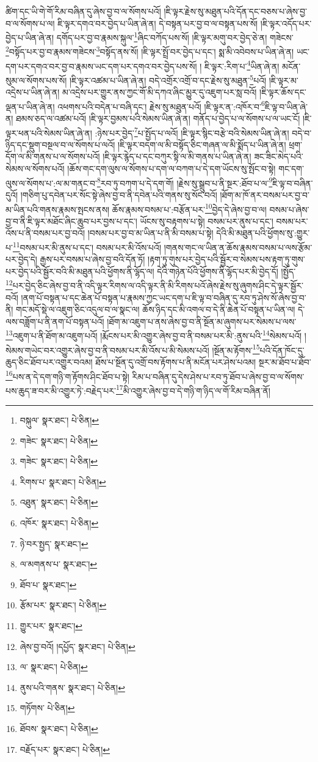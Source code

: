 ཚིག་དང་ཡི་གེ་གོ་རིམ་བཞིན་དུ་ཞེས་བྱ་བ་ལ་སོགས་པའོ། །ཇི་ལྟར་རྗེས་སུ་མཐུན་པའི་དོན་དང་བཅས་པ་ཞེས་བྱ་བ་ལ་སོགས་པ་ལ། ཇི་ལྟར་དགའ་བར་བྱེད་པ་ཡིན་ཞེ་ན། དེ་བསྟན་པར་བྱ་བ་ལ་བསྟན་པས་སོ། །ཇི་ལྟར་འདོད་པར་བྱེད་པ་ཡིན་ཞེ་ན། དགོད་པར་བྱ་བ་རྣམས་སྐུལ་\footnote{བསྐུལ་  སྣར་ཐང་།  པེ་ཅིན། }ཞིང་བཀོད་པས་སོ། །ཇི་ལྟར་མགུ་བར་བྱེད་ཅེ་ན། གཟེངས་\footnote{གཟེང་  སྣར་ཐང་།  པེ་ཅིན། }བསྟོད་པར་བྱ་བ་རྣམས་གཟེངས་\footnote{གཟེང་  སྣར་ཐང་།  པེ་ཅིན། }བསྟོད་ནས་སོ། །ཇི་ལྟར་སྤྲོ་བར་བྱེད་པ་དང་། སྨ་མི་འབེབས་པ་ཡིན་ཞེ་ན། ཡང་དག་པར་དགའ་བར་བྱ་བ་རྣམས་ཡང་དག་པར་དགའ་བར་བྱེད་པས་སོ། །
ཇི་ལྟར་:རིག་པ་\footnote{རིགས་པ་  སྣར་ཐང་།  པེ་ཅིན། }ཡིན་ཞེ་ན། མངོན་སུམ་ལ་སོགས་པས་སོ། །ཇི་ལྟར་འཚམ་པ་ཡིན་ཞེ་ན། བདེ་འགྲོར་འགྲོ་བ་དང་རྗེས་སུ་མཐུན་\footnote{འཐུན་  སྣར་ཐང་།  པེ་ཅིན། }པའོ། །ཇི་ལྟར་མ་འདྲེས་པ་ཡིན་ཞེ་ན། མ་འདྲེས་པར་གྱུར་ནས་ཀྱང་གོ་མི་དཀའ་ཞིང་མྱུར་དུ་འཇུག་པར་སླ་བའོ། །ཇི་ལྟར་ཆོས་དང་ལྡན་པ་ཡིན་ཞེ་ན། འཕགས་པའི་བདེན་པ་བཞི་དང་། རྗེས་སུ་མཐུན་པའོ། །ཇི་ལྟར་ན་:འཁོར་བ་\footnote{འཁོར་  སྣར་ཐང་།  པེ་ཅིན། }ཇི་ལྟ་བ་ཡིན་ཞེ་ན། ཐམས་ཅད་ལ་འཚམ་པའོ། །ཇི་ལྟར་བྱམས་པའི་སེམས་ཡིན་ཞེ་ན། གནོད་པ་བྱེད་པ་ལ་སོགས་པ་ལ་ཡང་ངོ། །ཇི་ལྟར་ཕན་པའི་སེམས་ཡིན་ཞེ་ན། :ཉེས་པར་བྱེད་\footnote{ཉེ་བར་སྤྱད་  སྣར་ཐང་། }པ་སྤྱོད་པ་ལའོ། །ཇི་ལྟར་སྙིང་བརྩེ་བའི་སེམས་ཡིན་ཞེ་ན། བདེ་བ་ཉིད་དང་སྡུག་བསྔལ་བ་ལ་སོགས་པ་ལའོ། །ཇི་ལྟར་བདག་ལ་མི་བསྟོད་ཅིང་གཞན་ལ་མི་སྨོད་པ་ཡིན་ཞེ་ན། ཕྲག་དོག་ལ་མི་གནས་པ་ལ་སོགས་པའོ། །ཇི་ལྟར་རྙེད་པ་དང་བཀུར་སྟི་ལ་མི་གནས་པ་ཡིན་ཞེ་ན། ཟང་ཟིང་མེད་པའི་སེམས་ལ་སོགས་པའོ། །ཆོས་གང་དག་ལུས་ལ་སོགས་པ་དག་ལ་བཀག་པ་དེ་དག་ཡོངས་སུ་སྤོང་བ་སྟེ། གང་དག་ལུས་ལ་སོགས་པ་:ལ་མ་གནང་བ་\footnote{ལ་མགནས་པ་  སྣར་ཐང་། }རབ་ཏུ་བཀག་པ་དེ་དག་གོ། །རྗེས་སུ་སྒྲུབ་པ་ནི་སྔར་:ཐོབ་པ་ལ་\footnote{ཐོབ་པ་  སྣར་ཐང་། }ཇི་ལྟ་བ་བཞིན་དུའོ། །གཅིག་པུ་དབེན་པར་སོང་སྟེ་ཞེས་བྱ་བ་ནི་དབེན་པའི་གནས་སུ་སོང་བའོ། །ཐོག་མ་ཁོ་ནར་བསམ་པར་བྱ་བ་མ་ཡིན་པའི་གནས་རྣམས་སྤངས་ནས། ཆོས་རྣམས་བསམ་པ་:བརྩོན་པར་\footnote{རྩོམ་པར་  སྣར་ཐང་།  པེ་ཅིན། }བྱེད་དེ་ཞེས་བྱ་བ་ལ། བསམ་པ་ཞེས་བྱ་བ་ནི་ཇི་ལྟར་མཐོང་ཞིང་ཆུབ་པར་བྱས་པ་དང་། ཡོངས་སུ་བརྟགས་པ་སྟེ། བསམ་པར་ནུས་པ་དང་། བསམ་པར་འོས་པ་ནི་བསམ་པར་བྱ་བའོ། །བསམ་པར་བྱ་བ་མ་ཡིན་པ་ནི་མི་བསམ་པ་སྟེ། དེའི་མི་མཐུན་པའི་ཕྱོགས་སུ་:གྱུར་པ་\footnote{གྱུར་པར་  སྣར་ཐང་། }བསམ་པར་མི་ནུས་པ་དང་། བསམ་པར་མི་འོས་པའོ། །གནས་གང་ལ་ཡིན་ན་ཆོས་རྣམས་བསམ་པ་ལས་རྩོམ་པར་བྱེད་དེ། རྒྱས་པར་བསམ་པ་ཞེས་བྱ་བའི་དོན་ཏོ། །རྟག་ཏུ་གུས་པར་བྱེད་པའི་སྦྱོར་བ་སེམས་པས་རྟག་ཏུ་གུས་པར་བྱེད་པའི་སྦྱོར་བའི་མི་མཐུན་པའི་ཕྱོགས་ནི་ལྷོད་ལ། དེའི་གཉེན་པོའི་ཕྱོགས་ནི་ལྷོད་པར་མི་བྱེད་དོ། །སྤྱོད་\footnote{ཞེས་བྱ་བའོ། །དཔྱོད་  སྣར་ཐང་།  པེ་ཅིན། }པར་བྱེད་ཅིང་ཞེས་བྱ་བ་ནི་འདི་ལྟར་རིགས་ལ་འདི་ལྟར་ནི་མི་རིགས་པའོ་ཞེས་རྗེས་སུ་ཞུགས་ཤིང་དེ་ལྟར་སྦྱོར་བའོ། །ནག་པོ་བསྟན་པ་དང་ཆེན་པོ་བསྟན་པ་རྣམས་ཀྱང་ཡང་དག་པ་ཇི་ལྟ་བ་བཞིན་དུ་རབ་ཏུ་ཤེས་སོ་ཞེས་བྱ་བ་ནི། གང་མདོ་སྡེ་ལ་འཇུག་ཅིང་འདུལ་བ་ལ་སྣང་ལ། ཆོས་ཉིད་དང་མི་འགལ་བ་དེ་ནི་ཆེན་པོ་བསྟན་པ་ཡིན་ལ། དེ་ལས་བཟློག་པ་ནི་ནག་པོ་བསྟན་པའོ། །ཐོག་མ་འཇུག་པ་ནས་ཞེས་བྱ་བ་ནི་སྔོན་མ་ཞུགས་པར་སེམས་པ་ལས་\footnote{ལ་  སྣར་ཐང་།  པེ་ཅིན། }འཇུག་པ་ནི་ཐོག་མ་འཇུག་པའོ། །རྨོངས་པར་མི་འགྱུར་ཞེས་བྱ་བ་ནི་བསམ་པར་མི་:ནུས་པའི་\footnote{ནུས་པའི་གནས་  སྣར་ཐང་།  པེ་ཅིན། }སེམས་པའོ། །སེམས་གཡེང་བར་འགྱུར་ཞེས་བྱ་བ་ནི་བསམ་པར་མི་འོས་པ་མི་སེམས་པའོ། །སྔོན་མ་རྟོགས་\footnote{གཏོགས་  པེ་ཅིན། }པའི་དོན་ཁོང་དུ་ཆུད་ཅིང་ཐོབ་པར་འགྱུར་བའམ། ཐོས་པ་སྔོན་དུ་འགྲོ་བས་རྟོགས་པ་ནི་མངོན་པར་ཤེས་པའམ། སྔར་མ་ཐོབ་པ་ཐོབ་\footnote{ཐོབས་  སྣར་ཐང་།  པེ་ཅིན། }པས་ན་དེ་དག་གཉི་ག་རྟོགས་ཤིང་ཐོབ་པ་སྟེ། རིམ་པ་བཞིན་དུ་དེས་ཤེས་པ་རབ་ཏུ་ཐོབ་པ་ཞེས་བྱ་བ་ལ་སོགས་པས་ཆུད་ཟ་བར་མི་འགྱུར་ཏེ་:བརྗེད་པར་\footnote{བརྗོད་པར་  སྣར་ཐང་།  པེ་ཅིན། }མི་འགྱུར་ཞེས་བྱ་བ་དེ་གཉི་ག་ཉིད་ལ་གོ་རིམ་བཞིན་ནོ། 